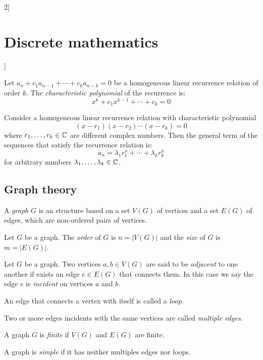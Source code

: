 \documentclass[../../../main.tex]{subfiles}
\begin{document}
\begin{multicols}{2}[\section{Discrete mathematics}]
  \begin{definition}
    Let $a_n+c_1a_{n-1}+\cdots+c_ka_{n-k}=0$ be a homogeneous linear recurrence relation of order $k$. The \emph{characteristic polynomial} of the recurrence is: $$x^k+c_1x^{k-1}+\cdots+c_k=0$$
  \end{definition}
  \begin{proposition}
    Consider a homogeneous linear recurrence relation with characteristic polynomial $$(x-r_1)(x-r_2)\cdots(x-r_k)=0$$ where $r_1,\ldots,r_k\in\mathbb{C} $ are different complex numbers. Then the general term of the sequences that satisfy the recurrence relation is: $$a_n=\lambda_1r_1^n+\cdots+\lambda_kr_k^n$$ for arbitrary numbers $\lambda_1,\ldots,\lambda_k\in\mathbb{C} $.
  \end{proposition}
  \subsection{Graph theory}
  \begin{definition}
    A \emph{graph} $G$ is an structure based on a set $V(G)$ of vertices and a set $E(G)$ of edges, which are non-ordered pairs of vertices.
  \end{definition}
  \begin{definition}
    Let $G$ be a graph. The \emph{order} of $G$ is $n=|V(G)|$ and the \emph{size} of $G$ is $m=|E(G)|$.
  \end{definition}
  \begin{definition}
    Let $G$ be a graph. Two vertices $a,b\in V(G)$ are said to be \emph{adjacent} to one another if exists an edge $e\in E(G)$ that connects them. In this case we say the edge $e$ is \emph{incident} on vertices $a$ and $b$.
  \end{definition}
  \begin{definition}
    An edge that connects a vertex with itself is called a \emph{loop}.
  \end{definition}
  \begin{definition}
    Two or more edges incidents with the same vertices are called \emph{multiple edges}.
  \end{definition}
  \begin{definition}
    A graph $G$ is \emph{finite} if $V(G)$ and $E(G)$ are finite.
  \end{definition}
  \begin{definition}
    A graph is \emph{simple} if it has neither multiples edges nor loops.
  \end{definition}
  \begin{definition}

\end{definition}
\end{multicols}
\end{document}
